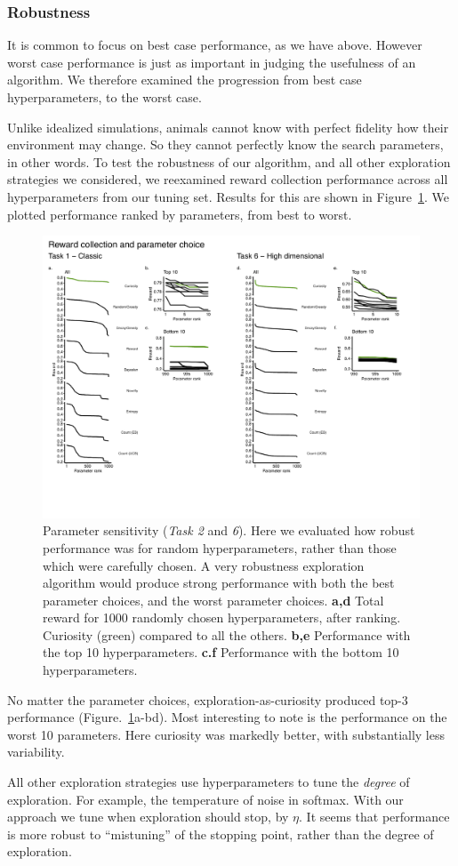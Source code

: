 \subsubsection*{Robustness}
It is common to focus on best case performance, as we have above. However worst case performance is just as important in judging the usefulness of an algorithm. We therefore examined the progression from best case hyperparameters, to the worst case.  

Unlike idealized simulations, animals cannot know with perfect fidelity how their environment may change. So they cannot perfectly know the search parameters, in other words. To test the robustness of our algorithm, and all other exploration strategies we considered, we reexamined reward collection performance across all hyperparameters from our tuning set. Results for this are shown in Figure~\ref{fig:robust}. We plotted performance ranked by parameters, from best to worst.

\begin{figure}
	\includegraphics[width=11.4cm]{img/robust.pdf} 
	\caption{Parameter sensitivity (\textit{Task 2} and \textit{6}). Here we evaluated how robust performance was for random hyperparameters, rather than those which were carefully chosen. A very robustness exploration algorithm would produce strong performance with both the best parameter choices, and the worst parameter choices. 
	\textbf{a,d} Total reward for 1000 randomly chosen hyperparameters, after ranking. Curiosity (green) compared to all the others.
	\textbf{b,e} Performance with the top 10 hyperparameters.
	\textbf{c.f} Performance with the bottom 10 hyperparameters.
	}
	\label{fig:robust}
\end{figure}

No matter the parameter choices, exploration-as-curiosity produced top-3 performance (Figure.~\ref{fig:robust}a-bd). Most interesting to note is the performance on the worst 10 parameters. Here curiosity was markedly better, with substantially less variability.

All other exploration strategies use hyperparameters to tune the \emph{degree} of exploration. For example, the temperature of noise in softmax. With our approach we tune when exploration should stop, by $\eta$. It seems that performance is more robust to ``mistuning'' of the stopping point, rather than the degree of exploration.